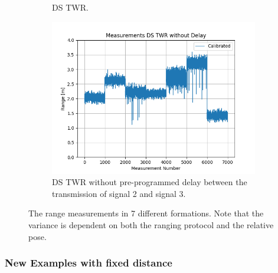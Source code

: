 \documentclass{decar-wsd}    %
\begin{document}
\begin{figure}[h]
\begin{subfigure}[t]{0.5\textwidth}
        \caption{DS TWR.}
    \end{subfigure}
    \begin{subfigure}[t]{0.5\textwidth}
        \centering
        \includegraphics[width=\columnwidth]{figs/ds_twr_no_delay.png}
        \caption{DS TWR without pre-programmed delay between the transmission of signal 2 and signal 3.}
    \end{subfigure}
    \caption{The range measurements in 7 different formations. Note that the variance is dependent on both the ranging protocol and the relative pose.}
    \label{fig:range_7formations}
\end{figure}

\clearpage
\subsubsection{New Examples with fixed distance}
\end{document}
